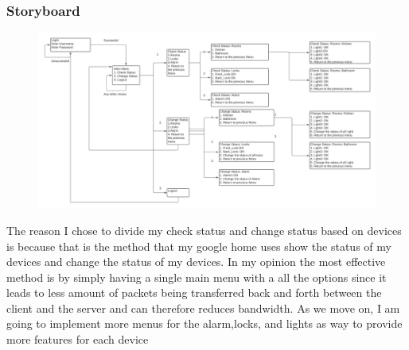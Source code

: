 \documentclass[11pt]{article}
\begin{document}
			\subsubsection{Storyboard}
				\begin{figure}[H]
					\centering
					\includegraphics[scale=0.5]{StoryBoard}
					\caption{}
					\label{fig:storyboard}
				\end{figure}
				The reason I chose to divide my check status and change status  based on devices is because that is the method that my google home uses show the status of my devices and change the status of my devices. In my opinion the most effective method is by simply having a single main menu with a all the options since it leads to less amount of packets being transferred back and forth between the client and the server and can therefore reduces bandwidth.
				As we move on, I am going to implement more menus for the alarm,locks, and lights as way to provide more features for each device
\end{document}
